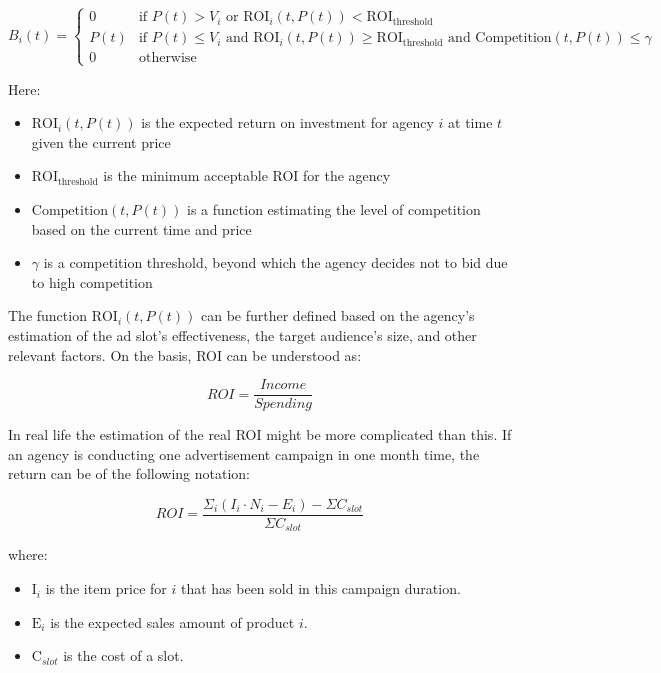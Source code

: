 \[
B_i(t) = 
\begin{cases} 
0 & \text{if } P(t) > V_i \text{ or } \text{ROI}_i(t, P(t)) < \text{ROI}_{\text{threshold}} \\
P(t) & \text{if } P(t) \leq V_i \text{ and } \text{ROI}_i(t, P(t)) \geq \text{ROI}_{\text{threshold}} \text{ and } \text{Competition}(t, P(t)) \leq \gamma \\
0 & \text{otherwise}
\end{cases}
\]

Here:
\begin{itemize}
    \item \( \text{ROI}_i(t, P(t)) \) is the expected return on investment for agency \( i \) at time \( t \) given the current price
    \item \( \text{ROI}_{\text{threshold}} \) is the minimum acceptable ROI for the agency
    \item \( \text{Competition}(t, P(t)) \) is a function estimating the level of competition based on the current time and price
    \item \( \gamma \) is a competition threshold, beyond which the agency decides not to bid due to high competition
\end{itemize}

The function \( \text{ROI}_i(t, P(t)) \) can be further defined based on the agency’s estimation of the ad slot’s effectiveness, the target audience's size, and other relevant factors.  On the basis, ROI can be understood as:

\begin{equation*}
    ROI = \frac{Income}{Spending}
\end{equation*}

In real life the estimation of the real ROI might be more complicated than this. If an agency is conducting one advertisement campaign in one month time, the return can be of the following notation:

\begin{equation*}
        ROI = \frac{\Sigma_i(I_i \cdot N_i - E_i) - \Sigma{C_{slot}}}{\Sigma{C_{slot}}}
\end{equation*}

where:
\begin{itemize}
    \item \( \text{I}_i \) is the item price for \(i\) that has been sold in this campaign duration. 
    \item \( \text{E}_i \) is the expected sales amount of product \(i\).
    \item \( \text{C}_{slot} \) is the cost of a slot.
\end{itemize}



